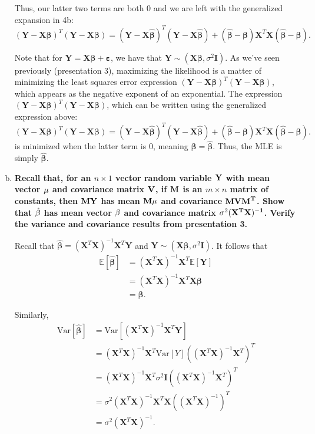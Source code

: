 \begin{enumerate}[a)]
Thus, our latter two terms are both $0$ and we are left with the generalized expansion in 4b:
\[
    (\bm{Y} - \bm{X\beta})^T(\bm{Y} - \bm{X\beta}) = (\bm{Y} - \bm{X}\hat{\bm{\beta}})^T(\bm{Y} - \bm{X\hat{\bm{\beta}}}) + (\hat{\bm{\beta}} - \bm{\beta})\bm{X}^T\bm{X}(\hat{\bm{\beta}} - \bm{\beta}).
\]

Note that for $\bm{Y} = \bm{X\bm{\beta}} + \bm{\varepsilon}$, we have that $\bm{Y} \sim (\bm{X\beta}, \sigma^2\bm{I})$. 
As we've seen previously (presentation 3), maximizing the likelihood is a matter of minimizing the least squares error expression $(\bm{Y} - \bm{X\beta})^T(\bm{Y} - \bm{X\beta})$, which appears as the negative exponent of an exponential.
The expression $(\bm{Y} - \bm{X\beta})^T(\bm{Y} - \bm{X\beta})$, which can be written using the generalized expression above:
\[
    (\bm{Y} - \bm{X\beta})^T(\bm{Y} - \bm{X\beta}) = (\bm{Y} - \bm{X}\hat{\bm{\beta}})^T(\bm{Y} - \bm{X\hat{\bm{\beta}}}) + (\hat{\bm{\beta}} - \bm{\beta})\bm{X}^T\bm{X}(\hat{\bm{\beta}} - \bm{\beta}).
\]
is minimized when the latter term is $0$, meaning $\bm{\beta} = \hat{\bm{\beta}}$. Thus, the MLE is simply $\hat{\bm{\beta}}$.

\item \textbf{Recall that, for an $n \times 1$ vector random variable $\bf{Y}$ with mean vector $\bf{\mu}$ and covariance matrix $\bf{V}$, if $\bf{M}$ is an $m \times n$ matrix of constants,
then $\bf{MY}$ has mean $\bf{M\mu}$ and covariance $\bf{MVM}^T$. Show that $\hat{\bf{\beta}}$ has mean vector $\bf{\beta}$ and covariance matrix $\sigma^2(\bf{X}^T \bf{X})^{-1}$. Verify the variance and covariance results from presentation 3.}

Recall that $\hat{\bm{\beta}} = (\bm{X}^T \bm{X})^{-1} \bm{X}^T \bm{Y}$ and  $\bm{Y} \sim (\bm{X\beta}, \sigma^2\bm{I})$. It follows that
\begin{align*}
    \mathbb{E}\left[\hat{\bm{\beta}} \right] &= (\bm{X}^T \bm{X})^{-1} \bm{X}^T  \mathbb{E}\left[\bm{Y} \right] \\
    &= (\bm{X}^T \bm{X})^{-1} \bm{X}^T \bm{X\beta} \\
    &= \bm{\beta}.
\end{align*}

Similarly,
\begin{align*}
    \mathrm{Var} \left[\hat{\bm{\beta}} \right] &= \mathrm{Var} \left[ (\bm{X}^T \bm{X})^{-1} \bm{X}^T \bm{Y} \right] \\
    &= (\bm{X}^T \bm{X})^{-1} \bm{X}^T \mathrm{Var} \left[Y \right] ((\bm{X}^T \bm{X})^{-1} \bm{X}^T)^T \\
    &= (\bm{X}^T \bm{X})^{-1} \bm{X}^T \sigma^2 \bm{I} ((\bm{X}^T \bm{X})^{-1} \bm{X}^T)^T \\
    &= \sigma^2 (\bm{X}^T \bm{X})^{-1} \bm{X}^T \bm{X} ((\bm{X}^T \bm{X})^{-1})^T \\
    &= \sigma^2 (\bm{X}^T \bm{X})^{-1}.
\end{align*}


\end{enumerate}
